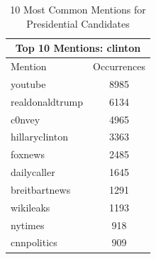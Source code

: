 \documentclass[12pt,a4paper]{report}
\begin{document}
\begin{table}[ht]
    \begin{tabular}[t]{|l|c|}
      \hline
      \multicolumn{2}{|c|}{Top 10 Mentions: clinton} \\
      \hline
      Mention & Occurrences \\ [0.5ex]
      \hline
      youtube & 8985 \\
      realdonaldtrump & 6134 \\
      c0nvey & 4965 \\
      hillaryclinton & 3363 \\
      foxnews & 2485 \\
      dailycaller & 1645 \\
      breitbartnews & 1291 \\
      wikileaks & 1193 \\
      nytimes & 918 \\
      cnnpolitics & 909 \\
      \hline
    \end{tabular}
    \caption{10 Most Common Mentions for Presidential Candidates}
    \label{t:5}
  \end{table}
  \clearpage
\end{document}
